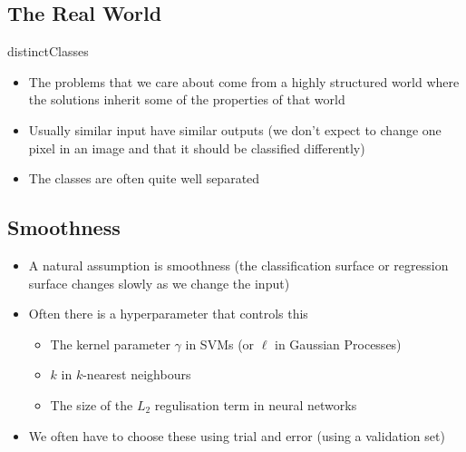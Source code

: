 
\begin{slide}
\section{The Real World}

\begin{PauseHighLight}
  \begin{rightImage}{distinctClasses}
  \begin{itemize}
  \item The problems that we care about come from a highly structured
    world  where the solutions inherit some of the properties of that
    world\pause
  \item Usually similar input have similar outputs (we don't expect to
    change one pixel in an image and that it should be classified
    differently)\pause
  \item The classes are often quite well separated\pause
  \end{itemize}
  \end{rightImage}
\end{PauseHighLight}

\end{slide}


\begin{slide}
\section{Smoothness}

\begin{PauseHighLight}
  \begin{itemize}
  \item A natural assumption is smoothness (the classification surface
    or regression surface changes slowly as we change the input)\pause
  \item Often there is a hyperparameter that controls this
    \begin{itemize}
    \item The kernel parameter $\gamma$ in SVMs (or $\ell$ in Gaussian
      Processes)
    \item $k$ in $k$-nearest neighbours
    \item The size of the $L_2$ regulisation term in neural networks\pause
    \end{itemize}
  \item We often have to choose these using trial and error (using a
    validation set)\pause
  \end{itemize}
\end{PauseHighLight}

\end{slide}

